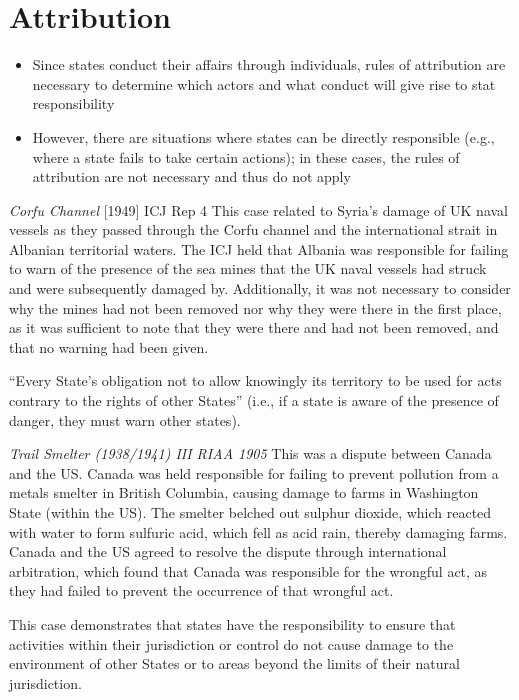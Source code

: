 \section{Attribution}
\begin{itemize}
    \item Since states conduct their affairs through individuals, rules of attribution are necessary to determine which actors and what conduct will give rise to stat responsibility
    \item However, there are situations where states can be directly responsible (e.g., where a state fails to take certain actions); in these cases, the rules of attribution are not necessary and thus do not apply
\end{itemize}

\begin{casedetails}{\textit{Corfu Channel} [1949] ICJ Rep 4}
    \flushleft
    This case related to Syria's damage of UK naval vessels as they passed through the Corfu channel and the international strait in Albanian territorial waters. The ICJ held that Albania was responsible for failing to warn of the presence of the sea mines that the UK naval vessels had struck and were subsequently damaged by. Additionally, it was not necessary to consider why the mines had not been removed nor why they were there in the first place, as it was sufficient to note that they were there and had not been removed, and that no warning had been given.

    \vspace{\baselineskip}

    ``Every State's obligation not to allow knowingly its territory to be used for acts contrary to the rights of other States'' (i.e., if a state is aware of the presence of danger, they must warn other states).
\end{casedetails}

\begin{casedetails}{\textit{Trail Smelter (1938/1941) III RIAA 1905}}
    \flushleft
    This was a dispute between Canada and the US. Canada was held responsible for failing to prevent pollution from a metals smelter in British Columbia, causing damage to farms in Washington State (within the US). The smelter belched out sulphur dioxide, which reacted with water to form sulfuric acid, which fell as acid rain, thereby damaging farms. Canada and the US agreed to resolve the dispute through international arbitration, which found that Canada was responsible for the wrongful act, as they had failed to prevent the occurrence of that wrongful act.

    \vspace{\baselineskip}

    This case demonstrates that states have the responsibility to ensure that activities within their jurisdiction or control do not cause damage to the environment of other States or to areas beyond the limits of their natural jurisdiction.
\end{casedetails}

